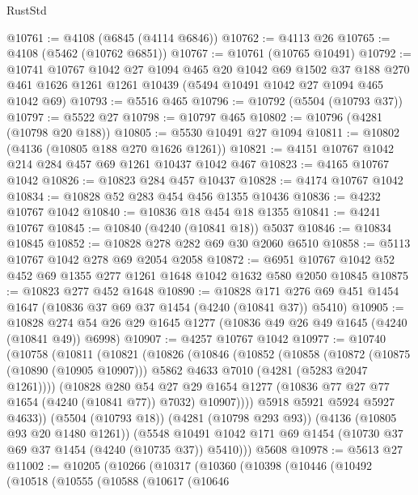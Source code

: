 \begin{lexlean}{RustStd}
\begin{coremodule}
{\begin{coremodule}
{{{{{{{{{{{{{{{{{{{{{{{{{{{{{{{{{{{@10761 := @4108 (@6845 (@4114 @6846))
@10762 := @4113 @26
@10765 := @4108 (@5462 (@10762 @6851))
@10767 := @10761 (@10765 @10491)
@10792 := @10741
    @10767
    @1042
    @27
    @1094
    @465
    @20
    @1042
    @69
    @1502
    @37
    @188
    @270
    @461
    @1626
    @1261
    @1261
    @10439
    (@5494 @10491 @1042 @27 @1094 @465 @1042 @69)
@10793 := @5516 @465
@10796 := @10792 (@5504 (@10793 @37))
@10797 := @5522 @27
@10798 := @10797 @465
@10802 := @10796 (@4281 (@10798 @20 @188))
@10805 := @5530 @10491 @27 @1094
@10811 := @10802 (@4136 (@10805 @188 @270 @1626 @1261))
@10821 := @4151 @10767 @1042 @214 @284 @457 @69 @1261 @10437 @1042 @467
@10823 := @4165 @10767 @1042
@10826 := @10823 @284 @457 @10437
@10828 := @4174 @10767 @1042
@10834 := @10828 @52 @283 @454 @456 @1355 @10436
@10836 := @4232 @10767 @1042
@10840 := @10836 @18 @454 @18 @1355
@10841 := @4241 @10767
@10845 := @10840 (@4240 (@10841 @18)) @5037
@10846 := @10834 @10845
@10852 := @10828 @278 @282 @69 @30 @2060 @6510
@10858 := @5113 @10767 @1042 @278 @69 @2054 @2058
@10872 := @6951 @10767 @1042 @52 @452 @69 @1355 @277 @1261 @1648 @1042 @1632 @580 @2050 @10845
@10875 := @10823 @277 @452 @1648
@10890 := @10828
    @171
    @276
    @69
    @451
    @1454
    @1647
    (@10836 @37 @69 @37 @1454 (@4240 (@10841 @37)) @5410)
@10905 := @10828 @274 @54 @26 @29 @1645 @1277 (@10836 @49 @26 @49 @1645 (@4240 (@10841 @49)) @6998)
@10907 := @4257 @10767 @1042
@10977 := @10740
    (@10758
      (@10811
        (@10821
          (@10826
            (@10846
              (@10852
                (@10858
                  (@10872
                    (@10875 (@10890 (@10905 @10907)))
                    @5862
                    @4633
                    @7010
                    (@4281 (@5283 @2047 @1261))))
                (@10828
                  @280
                  @54
                  @27
                  @29
                  @1654
                  @1277
                  (@10836 @77 @27 @77 @1654 (@4240 (@10841 @77)) @7032)
                  @10907))))
          @5918
          @5921
          @5924
          @5927
          @4633))
      (@5504 (@10793 @18))
      (@4281 (@10798 @293 @93))
      (@4136 (@10805 @93 @20 @1480 @1261))
      (@5548 @10491 @1042 @171 @69 @1454 (@10730 @37 @69 @37 @1454 (@4240 (@10735 @37)) @5410)))
    @5608
@10978 := @5613 @27
@11002 := @10205
    (@10266
      (@10317
        (@10360
          (@10398
            (@10446
              (@10492
                (@10518
                  (@10555
                    (@10588
                      (@10617
                        (@10646
}}}}}}}}}}}}}}}}}}}}}}}}}}}}}}}}}}}
\end{coremodule}}
\end{coremodule}
\end{lexlean}
